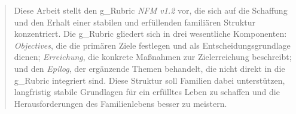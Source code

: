 \renewcommand{\abstractname}{Abstract}

\begin{abstract}
	Diese Arbeit stellt den \gls{g_Rubric} \textit{NFM v1.2} vor, die sich auf die Schaffung und den Erhalt einer stabilen und erfüllenden familiären Struktur konzentriert. Die \gls{g_Rubric} gliedert sich in drei wesentliche Komponenten: \textit{Objectives}, die die primären Ziele festlegen und als Entscheidungsgrundlage dienen; \textit{Erreichung}, die konkrete Maßnahmen zur Zielerreichung beschreibt; und den \textit{Epilog}, der ergänzende Themen behandelt, die nicht direkt in die \gls{g_Rubric} integriert sind. Diese Struktur soll Familien dabei unterstützen, langfristig stabile Grundlagen für ein erfülltes Leben zu schaffen und die Herausforderungen des Familienlebens besser zu meistern.
\end{abstract}